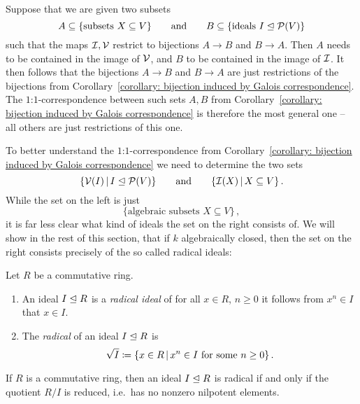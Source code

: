 \begin{fluff}
 Suppose that we are given two subsets
  \[
              A
    \subseteq \{ \text{subsets $X \subseteq V$} \}
    \qquad\text{and}\qquad
              B
    \subseteq \{ \text{ideals $I \trianglelefteq \mathcal{P}(V)$} \}
  \]
  such that the maps $\mathcal{I}, \mathcal{V}$ restrict to bijections $A \to B$ and $B \to A$.
  Then $A$ needs to be contained in the image of $\mathcal{V}$, and $B$ to be contained in the image of $\mathcal{I}$.
  It then follows that the bijections $A \to B$ and $B \to A$ are just restrictions of the bijections from Corollary~\ref{corollary: bijection induced by Galois correspondence}.
  The $1$:$1$-correspondence between such sets $A, B$ from Corollary~\ref{corollary: bijection induced by Galois correspondence} is therefore the most general one -- all others are just restrictions of this one.
  
  To better understand the $1$:$1$-correspondence from Corollary~\ref{corollary: bijection induced by Galois correspondence} we need to determine the two sets
  \[
    \{ \mc{V}(I) \suchthat I \idealeq \mc{P}(V) \}
    \qquad\text{and}\qquad
    \{ \mc{I}(X) \suchthat X \subseteq V \}\,.
  \]
  While the set on the left is just
  \[
    \{ \text{algebraic subsets $X \subseteq V$} \} \,,
  \]
  it is far less clear what kind of ideals the set on the right consists of.
  We will show in the rest of this section, that if $k$ algebraically closed, then the set on the right consists precisely of the so called radical ideals:
\end{fluff}


\begin{definition}
  Let $R$ be a commutative ring.
  \begin{enumerate}
    \item
      An ideal $I \trianglelefteq R$ is a \emph{radical ideal} of for all $x \in R$, $n \geq 0$ it follows from $x^n \in I$ that $x \in I$.
    \item
      The \emph{radical} of an ideal $I \trianglelefteq R$ is
      \[
                  \rad{I}
        \defined  \{
                    x \in R
                  \suchthat
                    \text{$x^n \in I$ for some $n \geq 0$}
                  \} \,.
      \]
  \end{enumerate}
\end{definition}


\begin{remark}
  If $R$ is a commutative ring, then an ideal $I \trianglelefteq R$ is radical if and only if the quotient $R/I$ is reduced, i.e.\ has no nonzero nilpotent elements.
\end{remark}


